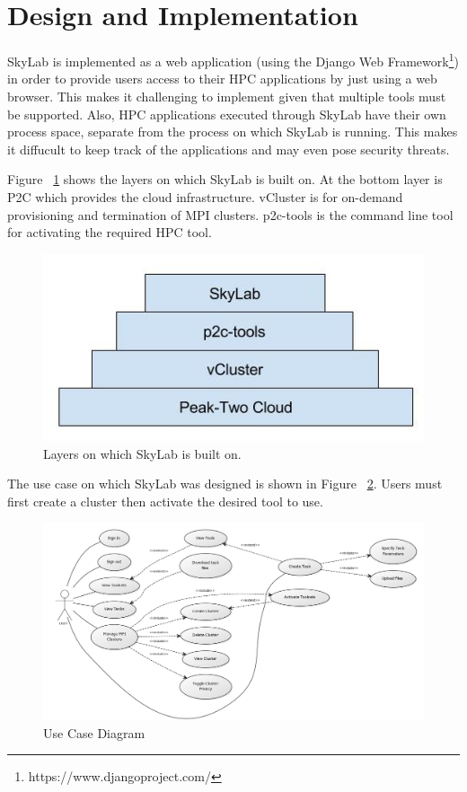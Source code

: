 \section{Design and Implementation}

SkyLab is implemented as a web application (using the Django Web Framework\footnote{https://www.djangoproject.com/}) in order to provide users access to their HPC applications by just using a web browser. This makes it challenging to implement given that multiple tools must be supported. Also, HPC applications executed through SkyLab have their own process space, separate from the process on which SkyLab is running. This makes it diffucult to keep track of the applications and may even pose security threats. 

Figure ~\ref{fig:sysarch} shows the layers on which SkyLab is built on. At the bottom layer is P2C which provides the cloud infrastructure. vCluster is for on-demand provisioning and termination of MPI clusters. p2c-tools is the command line tool for activating the required HPC tool.

	\begin{figure}[h]			
		\includegraphics[scale=0.30]{./images/skylab_layers.jpg}			
		\caption{\label{fig:sysarch}Layers on which SkyLab is built on.}	
	\end{figure}	

The use case on which SkyLab was designed is shown in Figure ~\ref{fig:usecase}. Users must first create a cluster then activate the desired tool to use.

    
    \begin{figure}[ht]
      \centering
      \includegraphics[scale=0.36]{./images/use_case_large.png}
      \caption{\label{fig:usecase}Use Case Diagram}
    \end{figure}


